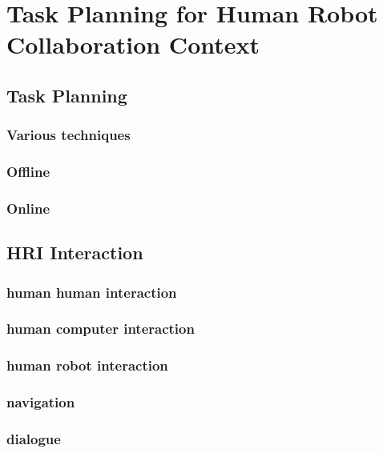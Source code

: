 \ifdefined{}
\else
\setcounter{chapter}{0}
\dominitoc
\faketableofcontents
\fi

\chapter{Task Planning for Human Robot Collaboration Context}
\label{chap:1}
\minitoc

\section{Task Planning}

\subsection{Various techniques}
\subsection{Offline}
\subsection{Online}

\section{HRI Interaction}

\subsection{human human interaction}
\subsection{human computer interaction}
\subsection{human robot interaction}

\subsection{navigation}
\subsection{dialogue}


